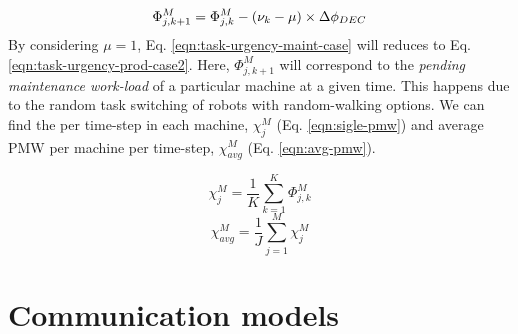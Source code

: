 \documentclass[journal]{IEEEtran}
\begin{document}
\begin{equation}
\begin{small}
\Phi_{j, k+1}^{M} = \Phi_{j, k}^{M}- (\nu_{k} - \mu) \times \Delta \phi_{DEC}
\label{eqn:task-urgency-maint-case}
\end{small}
\end{equation}
By considering $\mu = 1$, Eq. \ref{eqn:task-urgency-maint-case} will reduces to Eq. \ref{eqn:task-urgency-prod-case2}. Here, $\Phi_{j, k+1}^{M}$ will correspond to the {\em pending maintenance work-load} of a particular machine at a given time. This happens due to the random task switching of robots with random-walking options. %
We can find the  per time-step in each machine, $\chi_{j}^{M}$ (Eq. \ref{eqn:sigle-pmw}) and average PMW per machine per time-step, $\chi_{avg}^{M}$ (Eq. \ref{eqn:avg-pmw}).
\begin{multicols}{2}
\vspace*{-1.65cm}
\begin{small}
\begin{equation}
\chi_{j}^{M}= \frac{1}{K} \sum_{k=1}^{K} \Phi_{j, k}^{M}
\label{eqn:sigle-pmw}
\end{equation}
\begin{equation}
\chi_{avg}^{M}= \frac{1}{J} \sum_{j=1}^{M} {\chi_{j}^{M}}
\label{eqn:avg-pmw}
\end{equation}
\end{small}
\end{multicols}
\section{Communication models}
\label{sec:comm-model}
\end{document}
